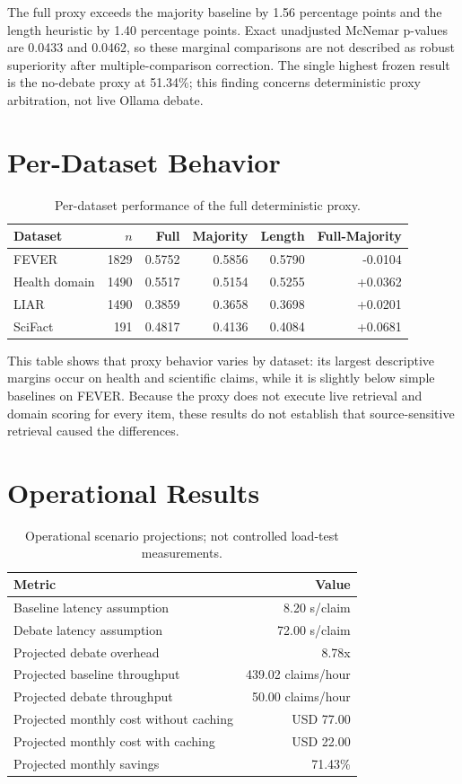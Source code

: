 \documentclass[12pt,a4paper,openright]{report}
\begin{document}
The full proxy exceeds the majority baseline by 1.56 percentage points and the length heuristic by 1.40 percentage points. Exact unadjusted McNemar p-values are 0.0433 and 0.0462, so these marginal comparisons are not described as robust superiority after multiple-comparison correction. The single highest frozen result is the no-debate proxy at 51.34\%; this finding concerns deterministic proxy arbitration, not live Ollama debate.

\section{Per-Dataset Behavior}

\begin{table}[H]
\centering
\caption{Per-dataset performance of the full deterministic proxy.}
\begin{tabular}{lrrrrr}
\toprule
Dataset & $n$ & Full & Majority & Length & Full-Majority \\
\midrule
FEVER & 1829 & 0.5752 & 0.5856 & 0.5790 & -0.0104 \\
Health domain & 1490 & 0.5517 & 0.5154 & 0.5255 & +0.0362 \\
LIAR & 1490 & 0.3859 & 0.3658 & 0.3698 & +0.0201 \\
SciFact & 191 & 0.4817 & 0.4136 & 0.4084 & +0.0681 \\
\bottomrule
\end{tabular}
\end{table}

This table shows that proxy behavior varies by dataset: its largest descriptive margins occur on health and scientific claims, while it is slightly below simple baselines on FEVER. Because the proxy does not execute live retrieval and domain scoring for every item, these results do not establish that source-sensitive retrieval caused the differences.

\section{Operational Results}

\begin{table}[H]
\centering
\caption{Operational scenario projections; not controlled load-test measurements.}
\begin{tabular}{lr}
\toprule
Metric & Value \\
\midrule
Baseline latency assumption & 8.20 s/claim \\
Debate latency assumption & 72.00 s/claim \\
Projected debate overhead & 8.78x \\
Projected baseline throughput & 439.02 claims/hour \\
Projected debate throughput & 50.00 claims/hour \\
Projected monthly cost without caching & USD 77.00 \\
Projected monthly cost with caching & USD 22.00 \\
Projected monthly savings & 71.43\% \\
\bottomrule
\end{tabular}
\end{table}
\end{document}
